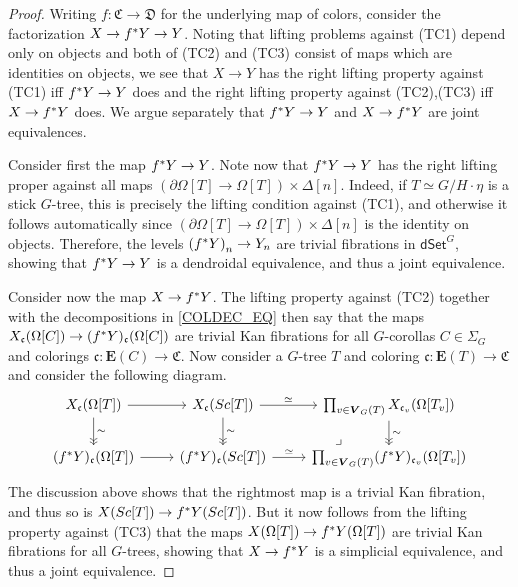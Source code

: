 \documentclass[a4paper,10pt]{article}%
\numberwithin{equation}{section}
\numberwithin{figure}{section}
\theoremstyle{definition} %
\newcommand{\1}{\ensuremath{\mathbbm 1}}%
\begin{document}
\begin{proof}
Writing $f \colon \mathfrak{C} \to \mathfrak{D}$ for the underlying map of colors,
consider the factorization $X \to f^{\**}Y \to Y$.
%
Noting that lifting problems against (TC1) depend only on objects and both of (TC2) and (TC3) consist of maps which are identities on objects,
we see that $X \to Y$ has the right lifting property against (TC1) iff 
$f^{\**} Y \to Y$ does
and the right lifting property against 
(TC2),(TC3) iff $X \to f^{\**}Y$ does.
We argue separately that 
$f^{\**} Y \to Y$ and $X \to f^{\**}Y$
are joint equivalences.

Consider first the map $f^{\**} Y \to Y$. Note now that $f^{\**} Y \to Y$ has the right lifting proper against all maps 
$\left(\partial \Omega[T] \to \Omega[T] \right) \times \Delta[n]$.
Indeed, if $T \simeq G/H \cdot \eta$ is a stick $G$-tree,
this is precisely the lifting condition against (TC1), and otherwise it follows automatically since $\left(\partial \Omega[T] \to \Omega[T] \right) \times \Delta[n]$ is the identity on objects.
Therefore, the levels 
$\left(f^{\**} Y \right)_n \to Y_n$ are trivial fibrations in 
$\mathsf{dSet}^G$, showing that 
$f^{\**} Y \to Y$ is a dendroidal equivalence, 
and thus a joint equivalence. 

Consider now the map $X \to f^{\**} Y$.
The lifting property against (TC2) 
together with the decompositions in
\eqref{COLDEC_EQ} %
then say that the maps
$X_{\mathfrak{c}}(\Omega[C]) \to 
(f^{\**} Y)_{\mathfrak{c}} (\Omega[C])$
are trivial Kan fibrations for all $G$-corollas $C \in \Sigma_G$
and colorings $\mathfrak{c} \colon \boldsymbol{E}(C) \to \mathfrak{C}$.
Now consider a $G$-tree $T$ and coloring
$\mathfrak{c} \colon \boldsymbol{E}(T) \to \mathfrak{C}$
and consider the following diagram.
\[
\begin{tikzcd}
X_{\mathfrak{c}}(\Omega[T]) \ar{r} \ar[->>]{d}{\sim}
&
X_{\mathfrak{c}}(Sc[T]) \ar{r}{\simeq} \ar[->>]{d}{\sim}
&
\prod_{v \in \boldsymbol{V}_G(T)} 
X_{\mathfrak{c}_v}(\Omega[T_v])
\ar[->>]{d}{\sim}
\\
(f^{\**} Y)_{\mathfrak{c}}(\Omega[T]) \ar{r}
&
(f^{\**} Y)_{\mathfrak{c}}(Sc[T]) \ar{r}{\simeq} 
&
\prod_{v \in \boldsymbol{V}_G(T)} 
(f^{\**} Y)_{\mathfrak{c}_v}
(\Omega[T_v]) 
\arrow[ul, phantom, "\lrcorner", very near start]
\end{tikzcd}
\]
The discussion above shows that the rightmost map is a trivial Kan fibration,
and thus so is 
$X(Sc[T]) \to f^{\**} Y (Sc[T])$.
But it now follows from the lifting property against
(TC3) that the maps 
$X(\Omega[T]) \to f^{\**} Y (\Omega[T])$
are trivial Kan fibrations for all $G$-trees,
showing that $X \to f^{\**} Y$ is a simplicial equivalence, and thus a joint equivalence. 
\end{proof}
\end{document}
